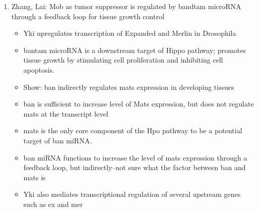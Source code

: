 \documentclass[12pt]{article}
\begin{document}
\begin{enumerate}
\begin{itemize}
\end{itemize}

\item Zhang, Lai: Mob as tumor suppressor is regulated by bandtam microRNA through a feedback loop for tissue growth control
\begin{itemize}
	\item Yki upregulates transcription of Expanded and Merlin in Drosophila
	\item bantam microRNA is a downstream target of Hippo pathway; promotes tissue growth by stimulating cell proliferation and inhibiting cell apoptosis. 
	\item Show: ban indirectly regulates mats expression in developing tissues
	\item ban is sufficient to increase level of Mats expression, but does not regulate mats at the transcript level
	\item mats is the only core component of the Hpo pathway to be a potential target of ban miRNA. 
	\item ban miRNA functions to increase the level of mats expression through a feedback loop, but indirectly--not sure what the factor between ban and mats is
	\item Yki also mediates transcriptional regulation of several upstream genes such as ex and mer
\end{itemize}


\end{enumerate}
\end{document}

